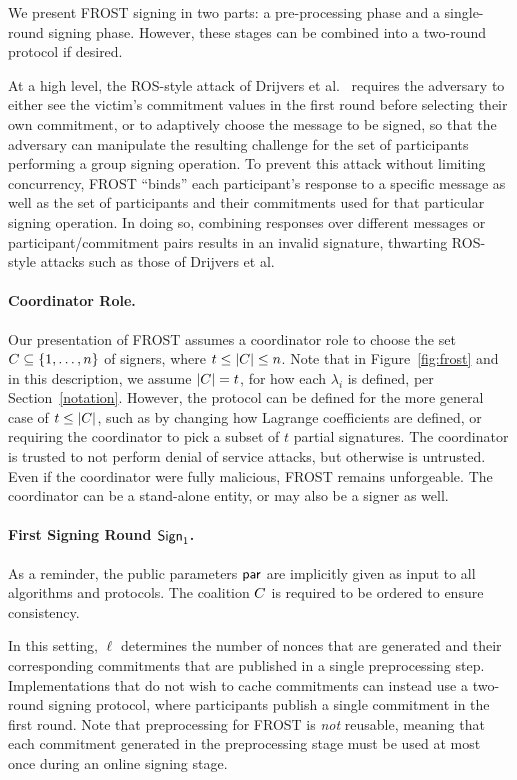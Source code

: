We present FROST signing in two parts: a pre-processing phase and a
single-round signing phase. However, these stages can be combined into a two-round protocol if desired.

At a high level,
the ROS-style attack of Drijvers et al.~\cite{DrijversEFKLNS19} requires the adversary to either
see the victim's commitment values in the first round before selecting their own commitment,
or to adaptively choose the message to
be signed, so that the adversary can manipulate the resulting challenge
for the set of participants performing a group signing operation.
To prevent this attack without limiting concurrency,
FROST ``binds'' each participant's response to a specific
message as well as the set of participants and their commitments used for that
particular signing operation. In doing so, combining responses
over different messages or participant/commitment pairs results in an invalid
signature, thwarting ROS-style attacks such as those of Drijvers et al.

\paragraph{Coordinator Role.}
Our presentation of FROST assumes a coordinator role to choose the set
$C \subseteq \{1, \ldots, n \}$ of signers,
where  $t \leq \left\lvert C\right\rvert \leq n$.
Note that in Figure~\ref{fig:frost} and in this description,
we assume $\lvert C \rvert = t$,
for how each $\lambda_i$ is defined,
per Section~\ref{notation}.
However, the protocol can be defined for the more general case of $t \leq \lvert C \rvert$,
such as by changing how Lagrange coefficients are defined,
or requiring the coordinator to pick a subset of $t$ partial signatures.
The coordinator is trusted to not perform denial of service attacks,
but otherwise is untrusted.
Even if the coordinator were fully malicious,
FROST remains unforgeable.
The coordinator can be a stand-alone entity,
or may also be a signer as well.


\paragraph{First Signing Round $\mathsf{Sign}_1$.}
As a reminder, the public parameters $\mathsf{par}$ are implicitly given as input to all algorithms and protocols.
The coalition $C$ is required to be ordered to ensure consistency.

In this setting, $\ell$ determines the number of
nonces that are generated and their corresponding commitments that are
published in a single preprocessing step.
Implementations that do not wish to cache commitments can instead
use a two-round signing protocol, where participants publish a single
commitment in the first round.
Note that preprocessing for FROST is \emph{not} reusable,
meaning that each commitment generated in the preprocessing stage must be used at most once during an online signing stage.

